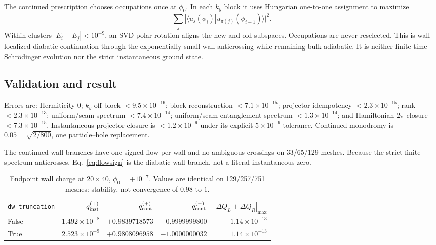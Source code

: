 \documentclass[aps,prb,onecolumn,nofootinbib,superscriptaddress]{revtex4-2}
\newcommand{\code}[1]{\texttt{#1}}
\begin{document}
The continued prescription chooses occupations once at $\phi_0$.  In each
$k_y$ block it uses Hungarian one-to-one assignment to maximize
\begin{equation}
 \sum_j|\langle u_j(\phi_i)|u_{\pi(j)}(\phi_{i+1})\rangle|^2.
\end{equation}
Within clusters $|E_i-E_j|<10^{-9}$, an SVD polar rotation aligns the new and
old subspaces.  Occupations are never reselected.  This is wall-localized
diabatic continuation through the exponentially small wall anticrossing while
remaining bulk-adiabatic.  It is neither finite-time Schr\"odinger evolution
nor the strict instantaneous ground state.

\subsection{Validation and result}

Errors are: Hermiticity $0$; $k_y$ off-block $<9.5\times10^{-16}$; block
reconstruction $<7.1\times10^{-15}$; projector idempotency
$<2.3\times10^{-15}$; rank $<2.3\times10^{-13}$; uniform/seam spectrum
$<7.4\times10^{-14}$; uniform/seam entanglement spectrum
$<1.3\times10^{-14}$; and Hamiltonian $2\pi$ closure
$<7.3\times10^{-15}$.  Instantaneous projector closure is
$<1.2\times10^{-9}$ under its explicit $5\times10^{-9}$ tolerance.
Continued monodromy is $0.05=\sqrt{2/800}$, one particle--hole replacement.

The continued wall branches have one signed flow per wall and no ambiguous
crossings on 33/65/129 meshes.  Because the strict finite spectrum anticrosses,
Eq.~\eqref{eq:flowsign} is the diabatic wall branch, not a literal
instantaneous zero.

\begin{table}[b]
\caption{Endpoint wall charge at $20\times40$, $\phi_0=+10^{-7}$.  Values are
identical on 129/257/751 meshes: stability, not convergence of $0.98$ to $1$.}
\begin{ruledtabular}
\begin{tabular}{lrrrr}
\code{dw\_truncation} & $q_{\rm inst}^{(+)}$ & $q_{\rm cont}^{(+)}$
& $q_{\rm cont}^{(-)}$ & $|\Delta Q_L+\Delta Q_R|_{\max}$ \\
\colrule
False & $1.492{\times}10^{-8}$ & $+0.9839718573$ & $-0.9999999800$
& $1.14{\times}10^{-13}$ \\
True & $2.523{\times}10^{-9}$ & $+0.9808096958$ & $-1.0000000032$
& $1.14{\times}10^{-13}$ \\
\end{tabular}
\end{ruledtabular}
\end{table}
\end{document}
